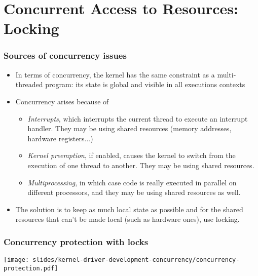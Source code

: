 \section{Concurrent Access to Resources: Locking}

\begin{frame}
  \frametitle{Sources of concurrency issues}
  \begin{itemize}
  \item In terms of concurrency, the kernel has the same constraint
    as a multi-threaded program: its state is global and visible
    in all executions contexts
  \item Concurrency arises because of
    \begin{itemize}
    \item \emph{Interrupts}, which interrupts the current thread to
      execute an interrupt handler. They may be using shared
      resources (memory addresses, hardware registers...)
    \item \emph{Kernel preemption}, if enabled, causes the kernel to
      switch from the execution of one thread to another. They
      may be using shared resources.
    \item \emph{Multiprocessing}, in which case code is really
      executed in parallel on different processors, and they may be
      using shared resources as well.
    \end{itemize}
  \item The solution is to keep as much local state as possible and
    for the shared resources that can't be made local (such as
    hardware ones), use locking.
  \end{itemize}
\end{frame}

\begin{frame}
  \frametitle{Concurrency protection with locks}
  \begin{center}
    \texttt{[image: slides/kernel-driver-development-concurrency/concurrency-protection.pdf]}
  \end{center}
\end{frame}

